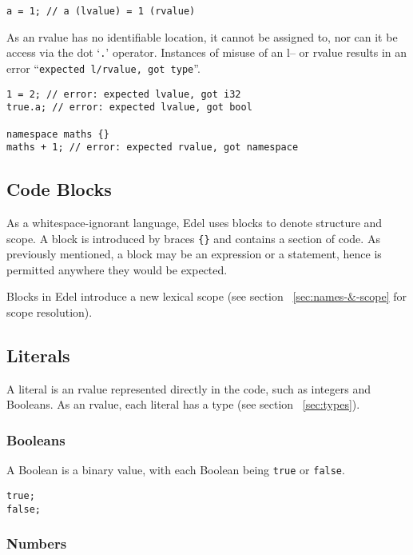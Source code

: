 \begin{lstlisting}[language=CustomLang]
a = 1; // a (lvalue) = 1 (rvalue)
\end{lstlisting}

As an rvalue has no identifiable location, it cannot be assigned to, nor can it be access via the dot `\texttt{.}' operator.
Instances of misuse of an l-- or rvalue results in an error ``\texttt{expected l/rvalue, got type}''.

\begin{lstlisting}[language=CustomLang]
1 = 2; // error: expected lvalue, got i32
true.a; // error: expected lvalue, got bool

namespace maths {}
maths + 1; // error: expected rvalue, got namespace
\end{lstlisting}

\subsection{Code Blocks}\label{subsec:code-blocks}

As a whitespace-ignorant language, Edel uses blocks to denote structure and scope.
A block is introduced by braces \texttt{\{\}} and contains a section of code.
As previously mentioned, a block may be an expression or a statement, hence is permitted anywhere they would be expected.

Blocks in Edel introduce a new lexical scope (see section ~\ref{sec:names-&-scope} for scope resolution).

\subsection{Literals}

A literal is an rvalue represented directly in the code, such as integers and Booleans.
As an rvalue, each literal has a type (see section ~\ref{sec:types}).

\subsubsection{Booleans}

A Boolean is a binary value, with each Boolean being \texttt{true} or \texttt{false}.

\begin{lstlisting}[language=CustomLang]
true;
false;
\end{lstlisting}

\subsubsection{Numbers}

